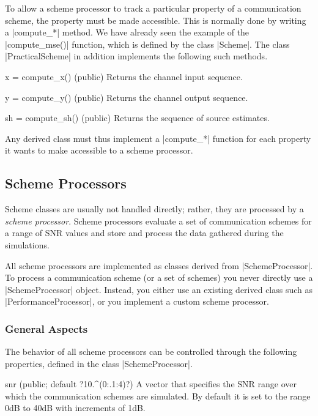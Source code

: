 To allow a scheme processor to track a particular property of a communication
scheme, the property must be made accessible. This is normally done by  writing
a |compute_*| method. We have already seen the example of the |compute_mse()|
function, which is defined by the class |Scheme|. The class |PracticalScheme| in
addition implements the following such methods.

\begin{method}{x = compute_x(\obj) (public)}
  Returns the channel input sequence.
\end{method}

\begin{method}{y = compute_y(\obj) (public)}
  Returns the channel output sequence.
\end{method}

\begin{method}{sh = compute_sh(\obj) (public)}
  Returns the sequence of source estimates.
\end{method}

Any derived class must thus implement a |compute_*| function for each
property it wants to make accessible to a scheme processor.


\subsection{Scheme Processors}

Scheme classes are usually not handled directly; rather, they are processed by
a \emph{scheme processor}. Scheme processors evaluate a set of communication
schemes for a range of SNR values and store and process the data gathered during
the simulations.

All scheme processors are implemented as classes derived from |SchemeProcessor|.
To process a communication scheme (or a set of schemes) you never directly use a
|SchemeProcessor| object. Instead, you either use an existing derived class such
as |PerformanceProcessor|, or you implement a custom scheme processor. 


\subsubsection{General Aspects}

The behavior of all scheme processors can be controlled through the following
properties, defined in the class |SchemeProcessor|.
\begin{property}{snr (public; default ?10.^(0:.1:4)?)}
  A vector that specifies the SNR range over which the
  communication schemes are simulated. By default it is set to the range
  0dB to 40dB with increments of 1dB. 
\end{property}

